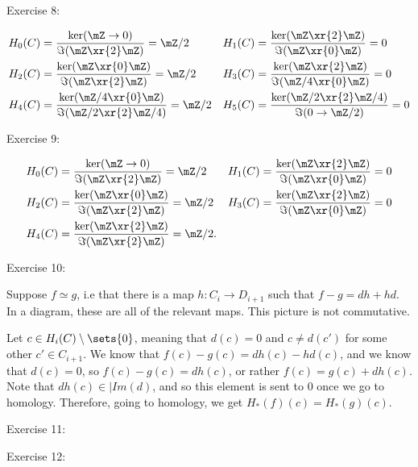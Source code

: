 \lineyspace
\noindent Exercise 8: 

\begin{align*}
    H_0(C)& = \frac{\ker(\mZ\to 0)}{\Im(\mZ\xr{2}\mZ)} = \mZ/2&
H_1(C)& = \frac{\ker(\mZ\xr{2}\mZ)}{\Im(\mZ\xr{0}\mZ)} = 0\\
H_2(C)& = \frac{\ker(\mZ\xr{0}\mZ)}{\Im(\mZ\xr{2}\mZ)} = \mZ/2&
H_3(C)& = \frac{\ker(\mZ\xr{2}\mZ)}{\Im(\mZ/4\xr{0}\mZ)} = 0\\
    H_4(C)& = \frac{\ker(\mZ/4\xr{0}\mZ)}{\Im(\mZ/2\xr{2}\mZ/4)} = \mZ/2&
    H_5(C)&= \frac{\ker (\mZ/2\xr{2}\mZ/4)}{\Im(0\to \mZ/2)}= 0
\end{align*}

\lineyspace 

\noindent Exercise 9: 

\begin{align*}
    H_0(C)& = \frac{\ker(\mZ\to 0)}{\Im(\mZ\xr{2}\mZ)} = \mZ/2 &
H_1(C)& = \frac{\ker(\mZ\xr{2}\mZ)}{\Im(\mZ\xr{0}\mZ)} = 0\\
H_2(C)& = \frac{\ker(\mZ\xr{0}\mZ)}{\Im(\mZ\xr{2}\mZ)} = \mZ/2 & 
H_3(C)& = \frac{\ker(\mZ\xr{2}\mZ)}{\Im(\mZ\xr{0}\mZ)} = 0\\
    H_4(C)& = \frac{\ker(\mZ\xr{2}\mZ)}{\Im(\mZ\xr{2}\mZ)} = \mZ/2.
\end{align*}

\lineyspace

\noindent Exercise 10: 

Suppose $f\simeq g$, i.e that there is a map $h:C_i\to D_{i+1}$ such that $f-g = dh+hd$. In a diagram, these are all of the relevant maps. This picture is not commutative. 
\begin{center}
\end{center}

Let $c\in H_i(C)\setminus\sets{0}$, meaning that $d(c) = 0$ and $c\neq d(c')$ for some other $c'\in C_{i+1}$. We know that $f(c)-g(c) = dh(c)-hd(c)$, and we know that $d(c) = 0$, so $f(c)-g(c) = dh(c)$, or rather $f(c) = g(c)+ dh(c)$. Note that $dh(c)\in |Im(d)$, and so this element is sent to 0 once we go to homology. Therefore, going to homology, we get $H_\ast(f)(c) = H_\ast(g)(c)$. 

\lineyspace

\noindent Exercise 11: 

\lineyspace

\noindent Exercise 12:

